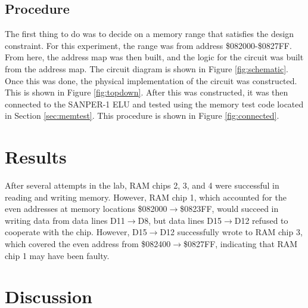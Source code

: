 \documentclass[12pt, twocolumn]{article}
\begin{document}
\subsection{Procedure}
The first thing to do was to decide on a memory range that satisfies the design constraint. For this experiment, the range was from address \$082000-\$0827FF. From here, the address map was then built, and the logic for the circuit was built from the address map. The circuit diagram is shown in Figure \ref{fig:schematic}. Once this was done, the physical implementation of the circuit was constructed. This is shown in Figure \ref{fig:topdown}. After this was constructed, it was then connected to the SANPER-1 ELU and tested using the memory test code located in Section \ref{sec:memtest}. This procedure is shown in Figure \ref{fig:connected}.

\section{Results}
After several attempts in the lab, RAM chips 2, 3, and 4 were successful in reading and writing memory. However, RAM chip 1, which accounted for the even addresses at memory locations \$082000$\to$\$0823FF, would succeed in writing data from data lines D11$\to$D8, but data lines D15$\to$D12 refused to cooperate with the chip. However, D15$\to$D12 successfully wrote to RAM chip 3, which covered the even address from \$082400$\to$\$0827FF, indicating that RAM chip 1 may have been faulty.
\section{Discussion}
\end{document}
